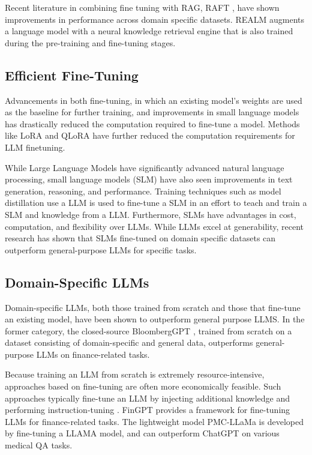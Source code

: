 Recent literature in combining fine tuning with RAG, RAFT \citep{zhang2024raft},
have shown improvements in performance across domain specific datasets. REALM
\citep{guu_realm_2020} augments a language model with a neural knowledge
retrieval engine that is also trained during the pre-training and fine-tuning
stages.

\subsection{Efficient Fine-Tuning}

Advancements in both fine-tuning, in which an existing model’s weights are used as the baseline for further training, and improvements in small language models has drastically reduced the computation required to fine-tune a model. Methods like LoRA and QLoRA have further reduced the computation requirements for LLM finetuning.

While Large Language Models have significantly advanced natural language processing, small language models (SLM) have also seen improvements in text generation, reasoning, and performance. Training techniques such as model distillation use a LLM is used to fine-tune a SLM in an effort to teach and train a SLM and knowledge from a LLM. Furthermore, SLMs have advantages in cost, computation, and flexibility over LLMs. While LLMs excel at generability, recent research has shown that SLMs fine-tuned on domain specific datasets can outperform general-purpose LLMs for specific tasks.

\subsection{Domain-Specific LLMs}

Domain-specific LLMs, both those trained from scratch and those that fine-tune
an existing model, have been shown to outperform general purpose LLMS. In the
former category, the closed-source BloombergGPT \citep{wu_bloomberggpt_2023},
trained from scratch on a dataset consisting of domain-specific and general
data, outperforms general-purpose LLMs on finance-related tasks.

Because training an LLM from scratch is extremely resource-intensive, approaches
based on fine-tuning are often more economically feasible. Such approaches
typically fine-tune an LLM by injecting additional knowledge and performing
instruction-tuning \citep{ouyang_training_2022}. FinGPT \citep{yang_fingpt_2023}
provides a framework for fine-tuning LLMs for finance-related tasks. The
lightweight model PMC-LLaMa \citep{wu_pmc-llama_2023} is developed by
fine-tuning a LLAMA model, and can outperform ChatGPT on various medical QA
tasks.
